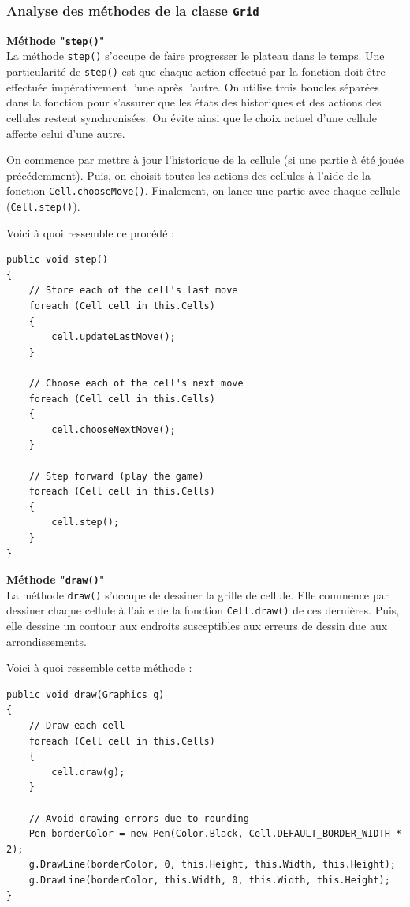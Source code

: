 \documentclass[a4paper, french]{article}
\begin{document}
\subsubsection{Analyse des méthodes de la classe \texttt{Grid}}
\textbf{Méthode "\texttt{step()}"}\\
La méthode \texttt{step()} s'occupe de faire progresser le plateau dans le temps. Une particularité de \texttt{step()} est que chaque action effectué par la fonction doit être effectuée impérativement l'une après l'autre. On utilise trois boucles séparées dans la fonction pour s'assurer que les états des historiques et des actions des cellules restent synchronisées. On évite ainsi que le choix actuel d'une cellule affecte celui d'une autre.

On commence par mettre à jour l'historique de la cellule (si une partie à été jouée précédemment). Puis, on choisit toutes les actions des cellules à l'aide de la fonction \texttt{Cell.chooseMove()}. Finalement, on lance une partie avec chaque cellule (\texttt{Cell.step()}).

Voici à quoi ressemble ce procédé :
\begin{lstlisting}
public void step()
{
    // Store each of the cell's last move
    foreach (Cell cell in this.Cells)
    {
        cell.updateLastMove();
    }

    // Choose each of the cell's next move
    foreach (Cell cell in this.Cells)
    {
        cell.chooseNextMove();
    }

    // Step forward (play the game)
    foreach (Cell cell in this.Cells)
    {
        cell.step();
    }
}
\end{lstlisting}

\textbf{Méthode "\texttt{draw()}"}\\
La méthode \texttt{draw()} s'occupe de dessiner la grille de cellule. Elle commence par dessiner chaque cellule à l'aide de la fonction \texttt{Cell.draw()} de ces dernières. Puis, elle dessine un contour aux endroits susceptibles aux erreurs de dessin due aux arrondissements.

Voici à quoi ressemble cette méthode :
\begin{lstlisting}
public void draw(Graphics g)
{
    // Draw each cell
    foreach (Cell cell in this.Cells)
    {
        cell.draw(g);
    }

    // Avoid drawing errors due to rounding
    Pen borderColor = new Pen(Color.Black, Cell.DEFAULT_BORDER_WIDTH * 2);
    g.DrawLine(borderColor, 0, this.Height, this.Width, this.Height);
    g.DrawLine(borderColor, this.Width, 0, this.Width, this.Height);
}
\end{lstlisting}
\pagebreak
\end{document}
